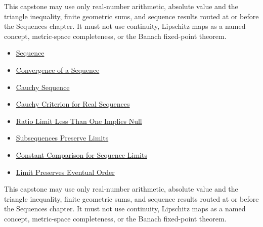 \begin{remark*}[Interpretation]
This capstone may use only real-number arithmetic, absolute value and the
triangle inequality, finite geometric sums, and sequence results routed at or
before the Sequences chapter. It must not use continuity, Lipschitz maps as a
named concept, metric-space completeness, or the Banach fixed-point theorem.
\end{remark*}

\begin{remark*}
\begin{itemize}
  \item \hyperref[def:sequence]{Sequence}
  \item \hyperref[def:convergent-sequence]{Convergence of a Sequence}
  \item \hyperref[def:cauchy-sequence]{Cauchy Sequence}
\end{itemize}
\end{remark*}

\begin{remark*}
\begin{itemize}
  \item \hyperref[thm:cauchy-criterion-real-sequences]{Cauchy Criterion for Real Sequences}
  \item \hyperref[thm:ratio-limit-less-than-one-implies-null]{Ratio Limit Less Than One Implies Null}
  \item \hyperref[thm:subsequences-preserve-limits]{Subsequences Preserve Limits}
  \item \hyperref[thm:constant-comparison-sequence-limits]{Constant Comparison for Sequence Limits}
  \item \hyperref[thm:limit-preserves-eventual-order]{Limit Preserves Eventual Order}
\end{itemize}
\end{remark*}

\begin{remark*}
This capstone may use only real-number arithmetic, absolute value and the
triangle inequality, finite geometric sums, and sequence results routed at or
before the Sequences chapter. It must not use continuity, Lipschitz maps as a
named concept, metric-space completeness, or the Banach fixed-point theorem.
\end{remark*}

